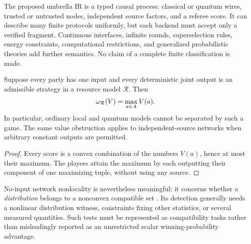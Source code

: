 The proposed umbrella IR is a typed causal process: classical or quantum wires,
trusted or untrusted nodes, independent source factors, and a referee score.
It can describe many finite protocols uniformly, but each backend must accept
only a verified fragment. Continuous interfaces, infinite rounds,
superselection rules, energy constraints, computational restrictions, and
generalized probabilistic theories add further semantics. No claim of a
complete finite classification is made.

\begin{proposition}
\label{prop:noinput}
Suppose every party has one input and every deterministic joint output is an
admissible strategy in a resource model $\mathcal R$. Then
\[
 \omega_{\mathcal R}(V)=\max_{a\in A}V(a).
\]
In particular, ordinary local and quantum models cannot be separated by such
a game. The same value obstruction applies to independent-source networks
when arbitrary constant outputs are permitted.
\end{proposition}
\begin{proof}
Every score is a convex combination of the numbers $V(a)$, hence at most
their maximum. The players attain the maximum by each outputting their
component of one maximizing tuple, without using any source.
\end{proof}
No-input network nonlocality is nevertheless meaningful: it concerns whether
a \emph{distribution} belongs to a nonconvex compatible set
\cite{fritz2012}. Its detection generally needs a nonlinear distribution
witness, constraints fixing other statistics, or several measured quantities.
Such tests must be represented as compatibility tasks rather than misleadingly
reported as an unrestricted scalar winning-probability advantage.

